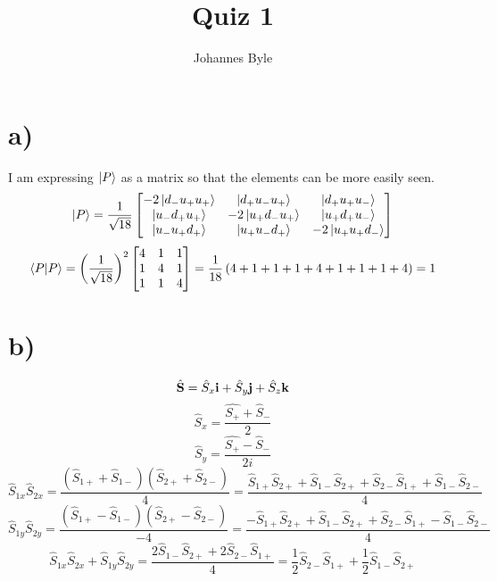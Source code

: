 \documentclass[english]{article}
\begin{document}
\author{Johannes Byle}
\title{Quiz 1}
\maketitle
\section*{a)}
I am expressing $\ket{P}$ as a matrix so that the elements can be more easily seen.
\[
\ket{P}=\frac{1}{\sqrt{18}}
\begin{bmatrix}
-2\ket{d_-u_+u_+} & \ket{d_+u_-u_+} & \ket{d_+u_+u_-}\\
\ket{u_-d_+u_+} & -2\ket{u_+d_-u_+} & \ket{u_+d_+u_-}\\
\ket{u_-u_+d_+} & \ket{u_+u_-d_+} & -2\ket{u_+u_+d_-}
\end{bmatrix}
\]
\[
\bra{P}\ket{P}=\left(\frac{1}{\sqrt{18}}\right)^2
\begin{bmatrix}
4 & 1 & 1\\
1 & 4 & 1\\
1 & 1 & 4
\end{bmatrix}
=\frac{1}{18}\left(4+1+1+1+4+1+1+1+4\right)=1
\]
\section*{b)}
$$\hat{\vb{S}}=\hat{S}_x\vb{i}+\hat{S}_y\vb{j}+\hat{S}_z\vb{k}$$
$$\hat{S}_x=\frac{\hat{S_+}+\hat{S}_-}{2}$$
$$\hat{S}_y=\frac{\hat{S_+}-\hat{S}_-}{2i}$$
$$\hat{S}_{1x}\hat{S}_{2x}=\frac{\left(\hat{S}_{1+}+\hat{S}_{1-}\right)\left(\hat{S}_{2+}+\hat{S}_{2-}\right)}{4}=\frac{\hat{S}_{1+}\hat{S}_{2+}+\hat{S}_{1-}\hat{S}_{2+}+\hat{S}_{2-}\hat{S}_{1+}+\hat{S}_{1-}\hat{S}_{2-}}{4}$$
$$\hat{S}_{1y}\hat{S}_{2y}=\frac{\left(\hat{S}_{1+}-\hat{S}_{1-}\right)\left(\hat{S}_{2+}-\hat{S}_{2-}\right)}{-4}=\frac{-\hat{S}_{1+}\hat{S}_{2+}+\hat{S}_{1-}\hat{S}_{2+}+\hat{S}_{2-}\hat{S}_{1+}-\hat{S}_{1-}\hat{S}_{2-}}{4}$$
$$\hat{S}_{1x}\hat{S}_{2x}+\hat{S}_{1y}\hat{S}_{2y}=\frac{2\hat{S}_{1-}\hat{S}_{2+}+2\hat{S}_{2-}\hat{S}_{1+}}{4}=\frac{1}{2}\hat{S}_{2-}\hat{S}_{1+}+\frac{1}{2}\hat{S}_{1-}\hat{S}_{2+}$$
\end{document}
